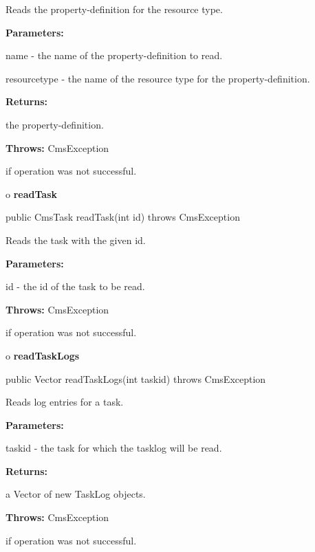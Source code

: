 \begin{description}
\htmlDD Reads the property-definition for the resource type. 

\begin{description}
\item {\bf Parameters:}  

name - the name of the property-definition to read.  

resourcetype - the name of the resource type for the property-definition.  
\item {\bf Returns:}  

the property-definition.  
\item {\bf Throws:} CmsException  

if operation was not successful.  
\end{description}

\end{description}

o {\bf readTask} 

\begin{PRE}
 public CmsTask readTask(int id) throws CmsException
\end{PRE}

\begin{description}
\htmlDD Reads the task with the given id. 

\begin{description}
\item {\bf Parameters:}  

id - the id of the task to be read.  
\item {\bf Throws:} CmsException  

if operation was not successful.  
\end{description}

\end{description}

o {\bf readTaskLogs} 

\begin{PRE}
 public Vector readTaskLogs(int taskid) throws CmsException
\end{PRE}

\begin{description}
\htmlDD Reads log entries for a task. 

\begin{description}
\item {\bf Parameters:}  

taskid - the task for which the tasklog will be read.  
\item {\bf Returns:}  

a Vector of new TaskLog objects.  
\item {\bf Throws:} CmsException  

if operation was not successful.  
\end{description}

\end{description}

